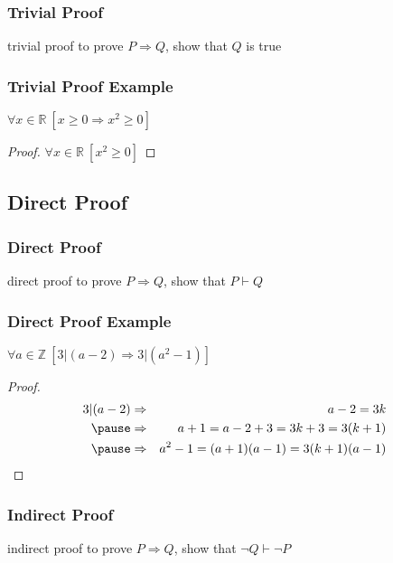 \documentclass[dvipsnames]{beamer}
\begin{document}
\begin{frame}
  \frametitle{Trivial Proof}

  \begin{block}{trivial proof}
    to prove $P \Rightarrow Q$, show that $Q$ is true
  \end{block}
\end{frame}

\begin{frame}
  \frametitle{Trivial Proof Example}

  \begin{theorem}
    $\forall x \in \mathbb{R}~[x \geq 0 \Rightarrow x^2 \geq 0]$
  \end{theorem}

  \pause
  \begin{proof}
    $\forall x \in \mathbb{R}~[x^2 \geq 0]$
  \end{proof}
\end{frame}

\subsection{Direct Proof}

\begin{frame}
  \frametitle{Direct Proof}

  \begin{block}{direct proof}
    to prove $P \Rightarrow Q$, show that $P \vdash Q$
  \end{block}
\end{frame}

\begin{frame}
  \frametitle{Direct Proof Example}

  \begin{theorem}
    $\forall a \in \mathbb{Z}~[3 | (a-2) \Rightarrow 3 | (a^2-1)]$
  \end{theorem}

  \pause
  \begin{proof}
    \begin{eqnarray*}
      3 | (a-2) & \Rightarrow & a-2 = 3k\\\pause
                & \Rightarrow & a+1 = a-2 + 3 = 3k+3 = 3(k+1)\\\pause
                & \Rightarrow & a^2-1 = (a+1)(a-1) = 3(k+1)(a-1)
    \end{eqnarray*}
  \end{proof}
\end{frame}

\begin{frame}
  \frametitle{Indirect Proof}

  \begin{block}{indirect proof}
    to prove $P \Rightarrow Q$, show that $\neg Q \vdash \neg P$
  \end{block}
\end{frame}
\end{document}
